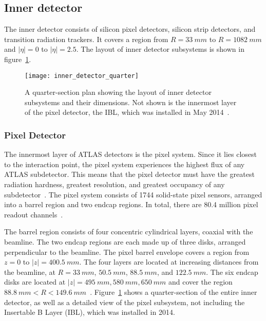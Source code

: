 \subsection{Inner detector}\label{subsec:inner_detector}
The inner detector consists of silicon pixel detectors, silicon strip detectors, and transition radiation trackers.
It covers a region from $R = 33~mm$ to $R = 1082~mm$ and $|\eta| = 0$ to $|\eta| = 2.5$.
The layout of inner detector subsystems is shown in figure~\ref{fig:inner_detector_quarter}.

\begin{figure}[!ht]\centering
\texttt{[image: inner\_detector\_quarter]}
\caption{A quarter-section plan showing the layout of inner detector subsystems and their dimensions.
Not shown is the innermost layer of the pixel detector, the IBL, which was installed in May 2014~\cite{lhc-machine-2008}.}
\label{fig:inner_detector_quarter}
\end{figure}

\subsubsection{Pixel Detector}\label{subsubsec:pixel}

The innermost layer of ATLAS detectors is the pixel system.
Since it lies closest to the interaction point, the pixel system experiences the highest flux of any ATLAS subdetector.
This means that the pixel detector must have the greatest radiation hardness, greatest resolution,
and greatest occupancy of any subdetector~\cite{atlas-detector-2008}.
The pixel system consists of 1744 solid-state pixel sensors, arranged into a barrel region and two endcap regions.
In total, there are 80.4 million pixel readout channels~\cite{atlas-detector-2008}.

The barrel region consists of four concentric cylindrical layers, coaxial with the beamline.
The two endcap regions are each made up of three disks, arranged perpendicular to the beamline.
The pixel barrel envelope covers a region from $z = 0$ to $|z|  = 400.5~mm$.
The four layers are located at increasing distances from the beamline, at $R = 33~mm$, $50.5~mm$, $88.5~mm$, and $122.5~mm$.
The six endcap disks are located at $|z| = 495~mm, 580~mm, 650~mm$ and cover the region $88.8~mm < R < 149.6~mm$~\cite{atlas-detector-2008}.
Figure~\ref{fig:inner_detector_quarter} shows a quarter-section of the entire inner detector, as well as a detailed view of the pixel subsystem, not including the Insertable B Layer (IBL), which was installed in 2014.

